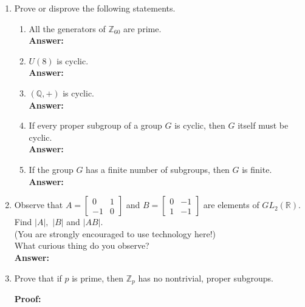\documentclass[12pt]{article}
\newcommand{\bbZ}{\mathbb{Z}}
\newcommand{\bbR}{\mathbb{R}}
\newcommand{\bbQ}{\mathbb{Q}}
\begin{document}
\begin{enumerate}
\item Prove or disprove the following statements. 
	\begin{enumerate}
	\item All the generators of $\bbZ_{60}$ are prime.\\
	\textbf{Answer:} \\
	\item $U(8)$ is cyclic.\\
	\textbf{Answer:} \\
	\item $(\bbQ,+)$ is cyclic.\\
	\textbf{Answer:} \\
	\item If every proper subgroup of a group $G$ is cyclic, then $G$ itself must be cyclic.\\
	\textbf{Answer:} \\
	\item If the group $G$ has a finite number of subgroups, then $G$ is finite.\\
	\textbf{Answer:} \\
	\end{enumerate}
\newpage
\item Observe that $A=\begin{bmatrix}0&1\\-1&0\end{bmatrix}$ and $B=\begin{bmatrix}0&-1\\1&-1\end{bmatrix}$ are elements of $GL_2(\bbR).$ Find $|A|,$ $|B|$ and $|AB|.$\\

 (You are strongly encouraged to use technology here!) \\
 
 What curious thing do you observe?\\

\textbf{Answer:} \\

\newpage

\item Prove that if $p$ is prime, then $\bbZ_p$ has no nontrivial, proper subgroups.

\textbf{Proof:} \\

\newpage


\end{enumerate}
\end{document}
